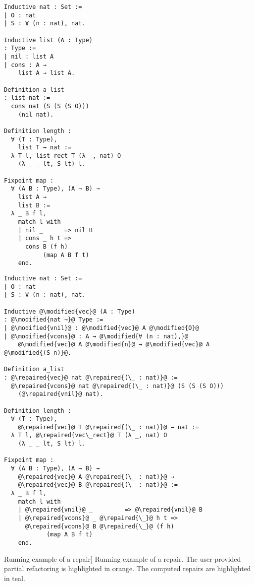 \begin{figure*}[!htp]

  \noindent%
  \begin{minipage}[t]{0.50\textwidth}
    \begin{verbatim}
Inductive nat : Set :=
| O : nat
| S : ∀ (n : nat), nat.

Inductive list (A : Type)
: Type :=
| nil : list A
| cons : A →
    list A → list A.

Definition a_list
: list nat :=
  cons nat (S (S (S O)))
    (nil nat).

Definition length :
  ∀ (T : Type),
    list T → nat :=
  λ T l, list_rect T (λ _, nat) O
    (λ _ _ lt, S lt) l.

Fixpoint map :
  ∀ (A B : Type), (A → B) →
    list A →
    list B :=
  λ _ B f l,
    match l with
    | nil _      => nil B
    | cons _ h t =>
      cons B (f h)
           (map A B f t)
    end.
  \end{verbatim}
\end{minipage}%
\begin{minipage}[t]{0.50\textwidth}
  \begin{verbatim}
Inductive nat : Set :=
| O : nat
| S : ∀ (n : nat), nat.

Inductive @\modified{vec}@ (A : Type)
: @\modified{nat →}@ Type :=
| @\modified{vnil}@ : @\modified{vec}@ A @\modified{O}@
| @\modified{vcons}@ : A → @\modified{∀ (n : nat),}@
    @\modified{vec}@ A @\modified{n}@ → @\modified{vec}@ A @\modified{(S n)}@.

Definition a_list
: @\repaired{vec}@ nat @\repaired{(\_ : nat)}@ :=
  @\repaired{vcons}@ nat @\repaired{(\_ : nat)}@ (S (S (S O)))
    (@\repaired{vnil}@ nat).

Definition length :
  ∀ (T : Type),
    @\repaired{vec}@ T @\repaired{(\_ : nat)}@ → nat :=
  λ T l, @\repaired{vec\_rect}@ T (λ _, nat) O
    (λ _ _ lt, S lt) l.

Fixpoint map :
  ∀ (A B : Type), (A → B) →
    @\repaired{vec}@ A @\repaired{(\_ : nat)}@ →
    @\repaired{vec}@ B @\repaired{(\_ : nat)}@ :=
  λ _ B f l,
    match l with
    | @\repaired{vnil}@ _         => @\repaired{vnil}@ B
    | @\repaired{vcons}@ _ @\repaired{\_}@ h t =>
      @\repaired{vcons}@ B @\repaired{\_}@ (f h)
            (map A B f t)
    end.
  \end{verbatim}
\end{minipage}

\caption%
[Running example of a \Chick{} repair]
{Running example of a \Chick{} repair.  The user-provided partial refactoring is highlighted in orange.  The computed repairs are highlighted in teal.}~\label{listtovec}

\end{figure*}

